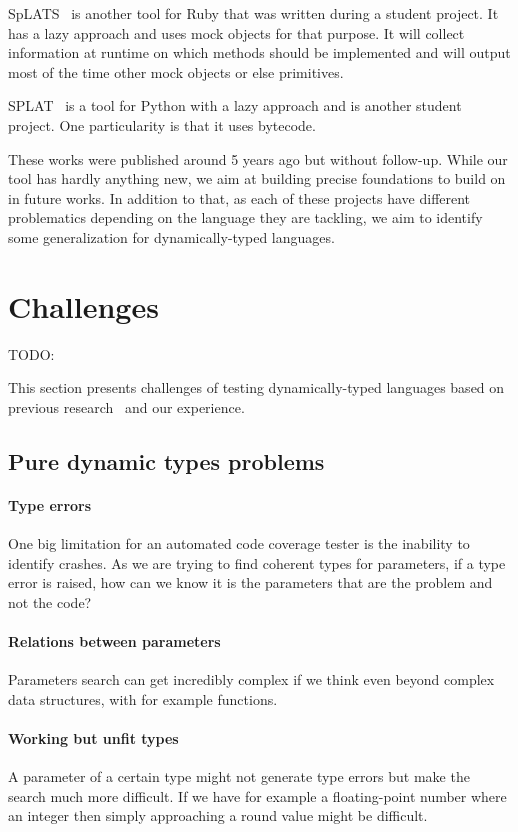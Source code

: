 \documentclass{llncs2e/llncs}
\def\todo#1{{\color{red}TODO:\quad#1}}
\begin{document}
SpLATS~\cite{splats} is another tool for Ruby that was written during a student
project. It has a lazy approach and uses mock objects for that purpose. It will
collect information at runtime on which methods should be implemented and will
output most of the time other mock objects or else primitives.

SPLAT~\cite{splat} is a tool for Python with a lazy approach and is another
student project. One particularity is that it uses bytecode.

These works were published around 5 years ago but without follow-up. While our
tool has hardly anything new, we aim at building precise foundations to build on
in future works. In addition to that, as each of these projects have different
problematics depending on the language they are tackling, we aim to identify
some generalization for dynamically-typed languages.



\section{Challenges}
\label{challenges}
\todo{}

This section presents challenges of testing dynamically-typed languages based on
previous research~\cite{ducasse2011challenges} and our experience.

\subsection{Pure dynamic types problems}
\paragraph{Type errors} One big limitation for an automated code coverage tester
is the inability to identify crashes. As we are trying to find coherent types
for parameters, if a type error is raised, how can we know it is the parameters
that are the problem and not the code?

\paragraph{Relations between parameters} Parameters search can get incredibly
complex if we think even beyond complex data structures, with for example
functions.

\paragraph{Working but unfit types} A parameter of a certain type might not
generate type errors but make the search much more difficult. If we have for
example a floating-point number where an integer then simply approaching a round
value might be difficult.
\end{document}
